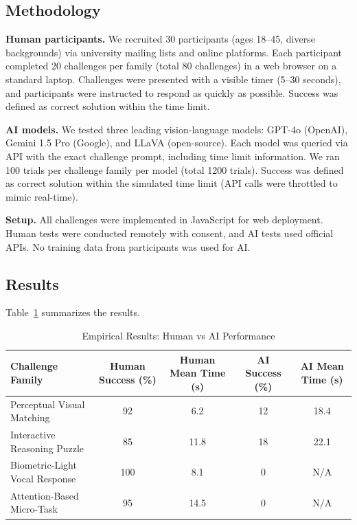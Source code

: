\documentclass[sigconf,nonacm]{acmart}
\begin{document}
\subsection{Methodology}

\textbf{Human participants.} We recruited 30 participants (ages 18--45, diverse backgrounds) via university mailing lists and online platforms. Each participant completed 20 challenges per family (total 80 challenges) in a web browser on a standard laptop. Challenges were presented with a visible timer (5--30 seconds), and participants were instructed to respond as quickly as possible. Success was defined as correct solution within the time limit.

\textbf{AI models.} We tested three leading vision-language models: GPT-4o (OpenAI), Gemini 1.5 Pro (Google), and LLaVA (open-source). Each model was queried via API with the exact challenge prompt, including time limit information. We ran 100 trials per challenge family per model (total 1200 trials). Success was defined as correct solution within the simulated time limit (API calls were throttled to mimic real-time).

\textbf{Setup.} All challenges were implemented in JavaScript for web deployment. Human tests were conducted remotely with consent, and AI tests used official APIs. No training data from participants was used for AI.

\subsection{Results}

Table~\ref{tab:evaluation-results} summarizes the results.

\begin{table}[t]
	\centering
	\caption{Empirical Results: Human vs AI Performance}
	\label{tab:evaluation-results}
	\begin{tabular}{lcccc}
		\toprule
		Challenge Family & Human Success (\%) & Human Mean Time (s) & AI Success (\%) & AI Mean Time (s) \\
		\midrule
		Perceptual Visual Matching & 92 & 6.2 & 12 & 18.4 \\
		Interactive Reasoning Puzzle & 85 & 11.8 & 18 & 22.1 \\
		Biometric-Light Vocal Response & 100 & 8.1 & 0 & N/A \\
		Attention-Based Micro-Task & 95 & 14.5 & 0 & N/A \\
		\bottomrule
	\end{tabular}
\end{table}
\end{document}
